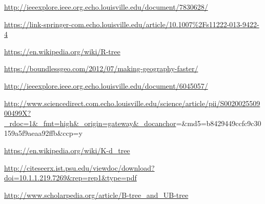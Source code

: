 \documentclass[]{article}
\begin{document}
\url{http://ieeexplore.ieee.org.echo.louisville.edu/document/7830628/}

\url{https://link-springer-com.echo.louisville.edu/article/10.1007\%2Fs11222-013-9422-4}

\url{https://en.wikipedia.org/wiki/R-tree}

\url{https://boundlessgeo.com/2012/07/making-geography-faster/}

\url{http://ieeexplore.ieee.org.echo.louisville.edu/document/6045057/}

\url{http://www.sciencedirect.com.echo.louisville.edu/science/article/pii/S002002550900499X?_rdoc=1\&_fmt=high\&_origin=gateway\&_docanchor}=\&md5=b8429449ccfc9c30159a5f9aeaa92ffb\&ccp=y

\url{https://en.wikipedia.org/wiki/K-d_tree}

\url{http://citeseerx.ist.psu.edu/viewdoc/download?doi=10.1.1.219.7269\&rep=rep1\&type=pdf}

\url{http://www.scholarpedia.org/article/B-tree_and_UB-tree}
\end{document}
